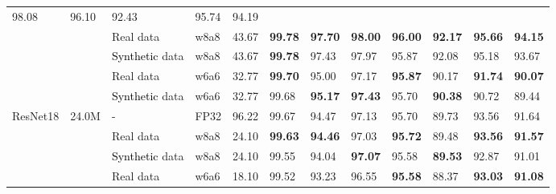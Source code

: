 \documentclass[a4paper,conference]{IEEEtran}
\begin{document}
\begin{table*}[!h]
\begin{tabular}{|l|l|l|l|l|lllll|ll|}
  \multicolumn{1}{l|}{98.08} &
  \multicolumn{1}{l|}{96.10} &
  92.43 &
  \multicolumn{1}{l|}{95.74} &
  94.19 \\ \cline{3-12} 
 &
   &
  Real data &
  w8a8 &
  43.67 &
  \multicolumn{1}{l|}{\textbf{99.78}} &
  \multicolumn{1}{l|}{\textbf{97.70}} &
  \multicolumn{1}{l|}{\textbf{98.00}} &
  \multicolumn{1}{l|}{\textbf{96.00}} &
  \textbf{92.17} &
  \multicolumn{1}{l|}{\textbf{95.66}} &
  \textbf{94.15} \\ \cline{3-12} 
 &
   &
  \textcolor{black}{Synthetic} data &
  w8a8 &
  43.67 &
  \multicolumn{1}{l|}{\textbf{99.78}} &
  \multicolumn{1}{l|}{97.43} &
  \multicolumn{1}{l|}{97.97} &
  \multicolumn{1}{l|}{95.87} &
  92.08 &
  \multicolumn{1}{l|}{95.18} &
  93.67 \\ \cline{3-12} 
 &
   &
  Real data &
  w6a6 &
  32.77 &
  \multicolumn{1}{l|}{\textbf{99.70}} &
  \multicolumn{1}{l|}{95.00} &
  \multicolumn{1}{l|}{97.17} &
  \multicolumn{1}{l|}{\textbf{95.87}} &
  90.17 &
  \multicolumn{1}{l|}{\textbf{91.74}} &
  \textbf{90.07} \\ \cline{3-12} 
 &
   &
  \textcolor{black}{Synthetic} data &
  w6a6 &
  32.77 &
  \multicolumn{1}{l|}{99.68} &
  \multicolumn{1}{l|}{\textbf{95.17}} &
  \multicolumn{1}{l|}{\textbf{97.43}} &
  \multicolumn{1}{l|}{95.70} &
  \textbf{90.38} &
  \multicolumn{1}{l|}{90.72} &
  89.44 \\ \hline
\multirow{5}{*}{ResNet18} &
  \multirow{5}{*}{24.0M} &
  - &
  FP32 &
  96.22 &
  \multicolumn{1}{l|}{99.67} &
  \multicolumn{1}{l|}{94.47} &
  \multicolumn{1}{l|}{97.13} &
  \multicolumn{1}{l|}{95.70} &
  89.73 &
  \multicolumn{1}{l|}{93.56} &
  91.64 \\ \cline{3-12} 
 &
   &
  Real data &
  w8a8 &
  24.10 &
  \multicolumn{1}{l|}{\textbf{99.63}} &
  \multicolumn{1}{l|}{\textbf{94.46}} &
  \multicolumn{1}{l|}{97.03} &
  \multicolumn{1}{l|}{\textbf{95.72}} &
  89.48 &
  \multicolumn{1}{l|}{\textbf{93.56}} &
  \textbf{91.57} \\ \cline{3-12} 
 &
   &
  \textcolor{black}{Synthetic} data &
  w8a8 &
  24.10 &
  \multicolumn{1}{l|}{99.55} &
  \multicolumn{1}{l|}{94.04} &
  \multicolumn{1}{l|}{\textbf{97.07}} &
  \multicolumn{1}{l|}{95.58} &
  \textbf{89.53} &
  \multicolumn{1}{l|}{92.87} &
  91.01 \\ \cline{3-12} 
 &
   &
  Real data &
  w6a6 &
  18.10 &
  \multicolumn{1}{l|}{99.52} &
  \multicolumn{1}{l|}{93.23} &
  \multicolumn{1}{l|}{96.55} &
  \multicolumn{1}{l|}{\textbf{95.58}} &
  88.37 &
  \multicolumn{1}{l|}{\textbf{93.03}} &
  \textbf{91.08} \\ \cline{3-12} 

\end{tabular}
\end{table*}
\end{document}
